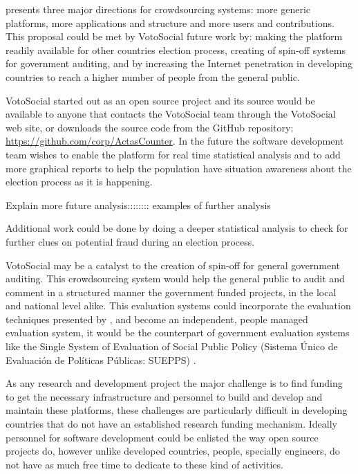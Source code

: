 \documentclass[letterpaper,10pt]{article}
\begin{document}
\cite{doan2011} presents three major directions for crowdsourcing systems: more generic platforms, more applications and structure and more users and contributions. This proposal could be met by VotoSocial future work by: making the platform readily available for other countries election process, creating of spin-off systems for government auditing, and by increasing the Internet penetration in developing countries to reach a higher number of people from the general public.

VotoSocial started out as an open source project and its source would be available to anyone that contacts the VotoSocial team through the VotoSocial web site, or downloads the source code from the GitHub repository: \url{https://github.com/corp/ActasCounter}. In the future the software development team wishes to enable the platform for real time statistical analysis and to add more graphical reports to help the population have situation awareness about the election process as it is happening.

Explain more future analysis:::::::: examples of further analysis

Additional work could be done by doing a deeper statistical analysis to check for further clues on potential fraud during an election process.

VotoSocial may be a catalyst to the creation of spin-off for general government auditing. This crowdsourcing system would help the general public to audit and comment in a structured manner the government funded projects, in the local and national level alike. This evaluation systems could incorporate the evaluation techniques presented by \citep{morra2009}, and become an independent, people managed evaluation system, it would be the counterpart of government evaluation systems like the Single System of Evaluation of Social Public Policy (Sistema \'{U}nico de Evaluaci\'{o}n de Pol\'{i}ticas P\'{u}blicas: SUEPPS) \cite{arias2014}.

As any research and development project the major challenge is to find funding to get the necessary infrastructure and personnel to build and develop and maintain these platforms, these challenges are particularly difficult in developing countries that do not have an established research funding mechanism. Ideally personnel for software development could be enlisted the way open source projects do, however unlike developed countries, people, specially engineers, do not have as much free time to dedicate to these kind of activities.
\end{document}
